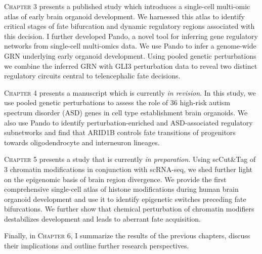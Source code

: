 {\scshape Chapter 3} presents a published study which introduces a single-cell multi-omic atlas of early brain organoid development. We harnessed this atlas to identify critical stages of fate bifurcation and dynamic regulatory regions associated with this decision. I further developed Pando, a novel tool for inferring gene regulatory networks from single-cell multi-omics data. We use Pando to infer a genome-wide GRN underlying early organoid development. Using pooled genetic perturbations we combine the inferred GRN with GLI3 perturbation data to reveal two distinct regulatory circuits central to telencephalic fate decisions.

{\scshape Chapter 4} presents a manuscript which is currently \textit{in revision}. In this study, we use pooled genetic perturbations to assess the role of 36 high-risk autism spectrum disorder (ASD) genes in cell type  establishment brain organoids. We also use Pando to identify perturbation-enriched and ASD-associated regulatory subnetworks and find that ARID1B controls fate transitions of progenitors towards oligodendrocyte and interneuron lineages.

{\scshape Chapter 5} presents a study that is currently \textit{in preparation}. Using scCut\&Tag of 3 chromatin modifications in conjunction with scRNA-seq, we shed further light on the epigenomic basis of brain region divergence. We provide the first comprehensive single-cell atlas of histone modifications during human brain organoid development and use it to identify epigenetic switches preceding fate bifurcations. We further show that chemical perturbation of chromatin modifiers destabilizes development and leads to aberrant fate acquisition. 

Finally, in {\scshape Chapter 6}, I summarize the results of the previous chapters, discuss their implications and outline further research perspectives.

\clearpage

\beginbibliography